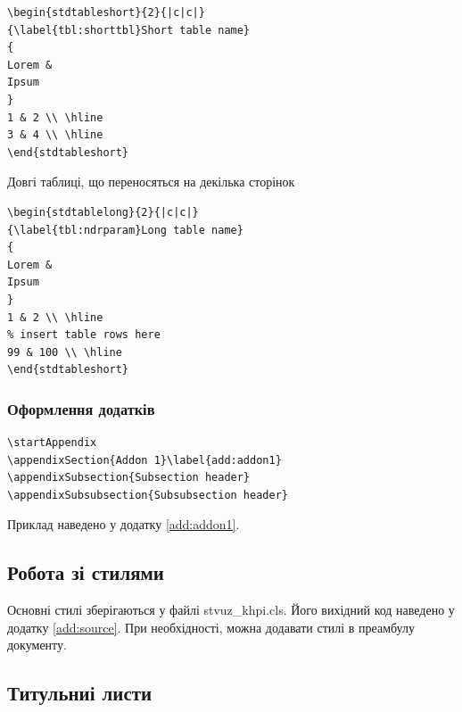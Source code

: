 \begin{framed}\small
\begin{lstlisting}
\begin{stdtableshort}{2}{|c|c|}
{\label{tbl:shorttbl}Short table name}
{
Lorem &
Ipsum
}
1 & 2 \\ \hline
3 & 4 \\ \hline
\end{stdtableshort}
\end{lstlisting}
\end{framed}

Довгі таблиці, що переносяться на декілька сторінок

\begin{framed}\small
\begin{lstlisting}
\begin{stdtablelong}{2}{|c|c|}
{\label{tbl:ndrparam}Long table name}
{
Lorem &
Ipsum
}
1 & 2 \\ \hline
% insert table rows here 
99 & 100 \\ \hline
\end{stdtableshort}
\end{lstlisting}
\end{framed}

\subsubsection{Оформлення додатків}

\begin{framed}
\begin{lstlisting}
\startAppendix
\appendixSection{Addon 1}\label{add:addon1} 
\appendixSubsection{Subsection header}
\appendixSubsubsection{Subsubsection header}
\end{lstlisting}
\end{framed}

Приклад наведено у додатку \ref{add:addon1}.

\subsection{Робота зі стилями}

Основні стилі зберігаються у файлі stvuz\_khpi.cls.
Його вихідний код наведено у додатку \ref{add:source}. При необхідності, можна
додавати стилі в преамбулу документу.

\subsection{Титульниі листи}

